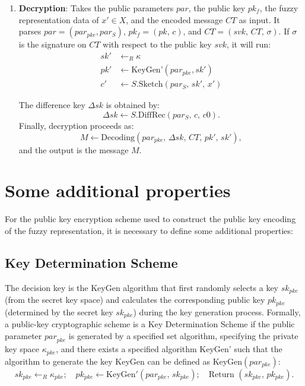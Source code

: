 \documentclass[graybox]{svmult}
\begin{document}
\begin{enumerate}
    \item \textbf{Decryption}: Takes the public parameters \(  par \), the public key \( pk_f \), the fuzzy representation data of \( x' \in X \), and the encoded message \( CT \) as input. It parses \( par  = (par_{pke}, par_S) \), \( pk_f = (pk, \, c) \), and \( CT = (svk, \, CT, \, \sigma) \). If \( \sigma \) is the signature on \( CT \) with respect to the public key \( svk \), it will run:
          \begin{align*}
              sk' & \leftarrow_R \kappa                              \\
              pk' & \leftarrow \text{KeyGen'}(par_{pke}, sk')        \\
              c'  & \leftarrow S.\text{Sketch}(par_S, \, sk', \, x')
          \end{align*}

          The difference key \( \Delta sk \) is obtained by:
          \[
              \Delta sk \leftarrow S.\text{DiffRec}(par_S, \, c, \, c0).
          \]
          Finally, decryption proceeds as:
          \[
              M \leftarrow \text{Decoding}(par_{pke}, \, \Delta sk, \, CT, \, pk', \, sk'),
          \]
          and the output is the message \( M \).
\end{enumerate}

\section{Some additional properties}
For the public key encryption scheme used to construct the public key encoding of the fuzzy representation, it is necessary to define some additional properties:

\subsection{Key Determination Scheme}

The decision key is the KeyGen algorithm that first randomly selects a key \( sk_{pke} \) (from the secret key space) and calculates the corresponding public key \( pk_{pke} \) \allowbreak (determined by the secret key \( {sk}_{pke} \)) during the key generation process. Formally, a public-key cryptographic scheme is a Key Determination Scheme if the public \allowbreak parameter \( {par}_{pke} \) is generated by a specified set algorithm, specifying the private key space \( \kappa_{pke} \), and there exists a specified algorithm KeyGen' such that the \allowbreak algorithm to generate the key KeyGen can be defined as \( \text{KeyGen}(par_{pke}) \):
\[
    sk_{pke} \leftarrow_R \kappa_{pke}; \quad pk_{pke} \leftarrow \text{KeyGen}'(par_{pke}, \, sk_{pke}); \quad \text{Return } (sk_{pke}, \, pk_{pke}).
\]
\end{document}
